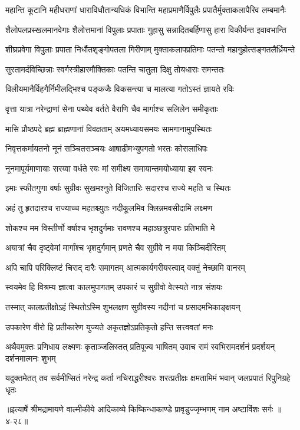 \twolineshloka
{महान्ति कूटानि महीधराणां धाराविधौतान्यधिकं विभान्ति}
{महाप्रमाणैर्विपुलैः प्रपातैर्मुक्ताकलापैरिव लम्बमानैः} %

\twolineshloka
{शैलोपलप्रस्खलमानवेगाः शैलोत्तमानां विपुलाः प्रपाताः}
{गुहासु सन्नादितबर्हिणासु हारा विकीर्यन्त इवावभान्ति} %

\twolineshloka
{शीघ्रप्रवेगा विपुलाः प्रपाता निर्धौतशृङ्गोपतला गिरीणाम्}
{मुक्ताकलापप्रतिमाः पतन्तो महागुहोत्सङ्गतलैर्ध्रियन्ते} %

\twolineshloka
{सुरतामर्दविच्छिन्नाः स्वर्गस्त्रीहारमौक्तिकाः}
{पतन्ति चातुला दिक्षु तोयधाराः समन्ततः} %

\twolineshloka
{विलीयमानैर्विहगैर्निमीलद्भिश्च पङ्कजैः}
{विकसन्त्या च मालत्या गतोऽस्तं ज्ञायते रविः} %

\twolineshloka
{वृत्ता यात्रा नरेन्द्राणां सेना पथ्येव वर्तते}
{वैराणि चैव मार्गाश्च सलिलेन समीकृताः} %

\twolineshloka
{मासि प्रौष्ठपदे ब्रह्म ब्राह्मणानां विवक्षताम्}
{अयमध्यायसमयः सामगानामुपस्थितः} %

\twolineshloka
{निवृत्तकर्मायतनो नूनं सञ्चितसञ्चयः}
{आषाढीमभ्युपगतो भरतः कोसलाधिपः} %

\twolineshloka
{नूनमापूर्यमाणायाः सरय्वा वर्धते रयः}
{मां समीक्ष्य समायान्तमयोध्याया इव स्वनः} %

\twolineshloka
{इमाः स्फीतगुणा वर्षाः सुग्रीवः सुखमश्नुते}
{विजितारिः सदारश्च राज्ये महति च स्थितः} %

\twolineshloka
{अहं तु हृतदारश्च राज्याच्च महतश्च्युतः}
{नदीकूलमिव क्लिन्नमवसीदामि लक्ष्मण} %

\twolineshloka
{शोकश्च मम विस्तीर्णो वर्षाश्च भृशदुर्गमाः}
{रावणश्च महाञ्छत्रुरपारः प्रतिभाति मे} %

\twolineshloka
{अयात्रां चैव दृष्ट्वेमां मार्गांश्च भृशदुर्गमान्}
{प्रणते चैव सुग्रीवे न मया किञ्चिदीरितम्} %

\twolineshloka
{अपि चापि परिक्लिष्टं चिराद् दारैः समागतम्}
{आत्मकार्यगरीयस्त्वाद् वक्तुं नेच्छामि वानरम्} %

\twolineshloka
{स्वयमेव हि विश्रम्य ज्ञात्वा कालमुपागतम्}
{उपकारं च सुग्रीवो वेत्स्यते नात्र संशयः} %

\twolineshloka
{तस्मात् कालप्रतीक्षोऽहं स्थितोऽस्मि शुभलक्षण}
{सुग्रीवस्य नदीनां च प्रसादमभिकाङ्क्षयन्} %

\twolineshloka
{उपकारेण वीरो हि प्रतीकारेण युज्यते}
{अकृतज्ञोऽप्रतिकृतो हन्ति सत्त्ववतां मनः} %

\twolineshloka
{अथैवमुक्तः प्रणिधाय लक्ष्मणः कृताञ्जलिस्तत् प्रतिपूज्य भाषितम्}
{उवाच रामं स्वभिरामदर्शनं प्रदर्शयन् दर्शनमात्मनः शुभम्} %

\twolineshloka
{यदुक्तमेतत् तव सर्वमीप्सितं नरेन्द्र कर्ता नचिराद्धरीश्वरः}
{शरत्प्रतीक्षः क्षमतामिमं भवान् जलप्रपातं रिपुनिग्रहे धृतः} %


॥इत्यार्षे श्रीमद्रामायणे वाल्मीकीये आदिकाव्ये किष्किन्धाकाण्डे प्रावृडुज्जृम्भणम् नाम अष्टाविंशः सर्गः ॥४-२८॥
